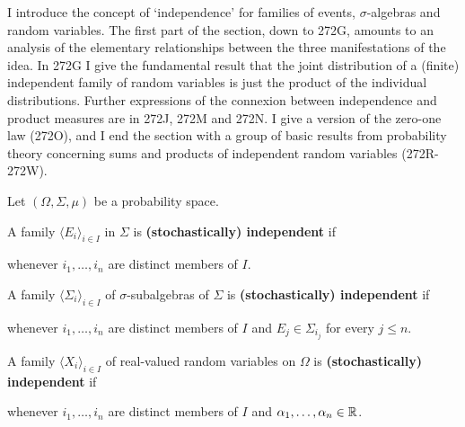 
\def\hatcalBnu{\hat\Cal B_{\nu}}

\def\chaptername{Probability theory}
\def\sectionname{Independence}


I introduce the concept of `independence' for families of events,
$\sigma$-algebras and random variables.   The first part of the section,
down to 272G, amounts to an analysis of the elementary relationships
between the three manifestations of the idea.   In 272G I give the
fundamental result that the joint distribution of a (finite) independent
family of random variables is just the product of the individual
distributions.   Further expressions of the connexion between
independence and product measures are in 272J, 272M and 272N.
I give a
version of the zero-one law (272O), and I end the section with a
group of basic results from probability theory concerning sums and
products of independent random variables (272R-272W).

 Let $(\Omega,\Sigma,\mu)$ be a 
probability space.

 A family $\langle E_i\rangle_{i\in I}$ in
$\Sigma$ is {\bf (stochastically) independent} if


\noindent whenever $i_1,\ldots,i_n$ are distinct members of $I$.

 A family $\langle\Sigma_i\rangle_{i\in I}$ of
$\sigma$-subalgebras of $\Sigma$ is {\bf (stochastically) independent}
if


\noindent whenever $i_1,\ldots,i_n$ are distinct members of $I$ and
$E_j\in\Sigma_{i_j}$ for every $j\le n$.

 A family $\langle X_i\rangle_{i\in I}$ of
real-valued random variables on $\Omega$ is {\bf (stochastically)
independent} if


\noindent whenever $i_1,\ldots,i_n$ are distinct members of $I$ and
$\alpha_1,\ldots,\alpha_n\in\Bbb R$.

